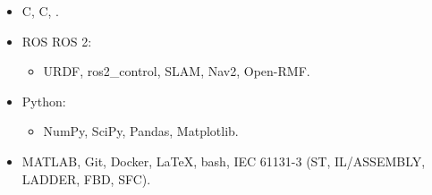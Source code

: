 \documentclass[10pt,a4paper,sans]{moderncv} %
\newcommand{\CPP}{C\nolinebreak\hspace{-.05em}\raisebox{.4ex}{\tiny \textbf{+}}\nolinebreak\hspace{-.10em}\raisebox{.4ex}{\tiny \textbf{+}}\hspace{1mm}}
\newcommand{\Cs}{C\nolinebreak\raisebox{.4ex}{\scriptsize \textbf{\#}}}
\newif\ifen
\newif\iffr
\newif\ifpt
\newcommand{\en}[2][]{\ifen#2\else#1\fi}
\newcommand{\fr}[2][]{\iffr#2\else#1\fi}
\newcommand{\pt}[2][]{\ifpt#2\else#1\fi}
\begin{document}
\begin{tcolorbox}
\begin{minipage}[t]{0.33\textwidth}
\begin{tcolorbox}[grow to left by=0.6cm,colback=darkdarkgrey,colframe=darkdarkgrey,arc=0mm]
            \small 

            \begin{itemize}
                \item[\faAngleRight] C, \en{Embedded }C\fr{ Embarqué}, \en{Modern }\CPP\fr{ moderne}.
                \item[\faAngleRight] ROS \en{and}\pt{e} ROS 2:
                    \begin{itemize}
                        \item URDF, ros2\_control, SLAM, Nav2, Open-RMF.
                    \end{itemize}
                \item[\faAngleRight] Python:
                    \begin{itemize}
                        \item NumPy, SciPy, Pandas, Matplotlib.
                    \end{itemize}
                \item[\faAngleRight] MATLAB, Git, Docker, \LaTeX, bash, IEC 61131-3 (ST, IL/ASSEMBLY, LADDER, FBD, SFC).
                
            \end{itemize}
            

\end{tcolorbox}
\end{minipage}
\end{tcolorbox}
\end{document}
